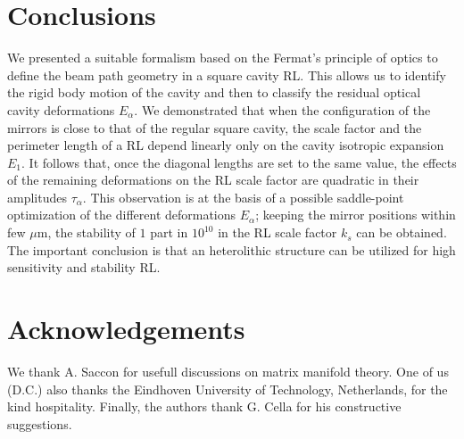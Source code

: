 \documentclass[12pt,a4paper,final]{iopart}
\begin{document}
\section{Conclusions}
We presented a suitable formalism based on the Fermat's principle of optics 
to define the beam path geometry in a square cavity RL. This allows us to identify 
the rigid body motion of the cavity and then to classify the residual optical cavity deformations $E_{\alpha}$. 
We demonstrated that when the configuration of the mirrors is close to
that of the regular square cavity, the scale factor and the perimeter length of a RL depend linearly only on the cavity isotropic expansion 
$E_{1}$. It follows that, once the diagonal lengths are set to the same value, the effects of the
remaining deformations on the RL scale factor are quadratic in their
amplitudes $\tau_{\alpha}$. This observation is at the basis of a possible saddle-point optimization 
of the different deformations $E_{\alpha}$; keeping the mirror positions within few $\mu$m, the stability of $1$ part in $10^{10}$ in the RL scale factor $k_s$ can be obtained. The important conclusion is that an heterolithic structure can be utilized for high sensitivity and stability RL. 
\section*{Acknowledgements}
We thank A. Saccon for usefull discussions on matrix manifold theory. 
One of us (D.C.) also thanks the Eindhoven University of Technology, Netherlands, for the kind hospitality. 
Finally, the authors thank G. Cella for his constructive suggestions.\\
 
\end{document}
